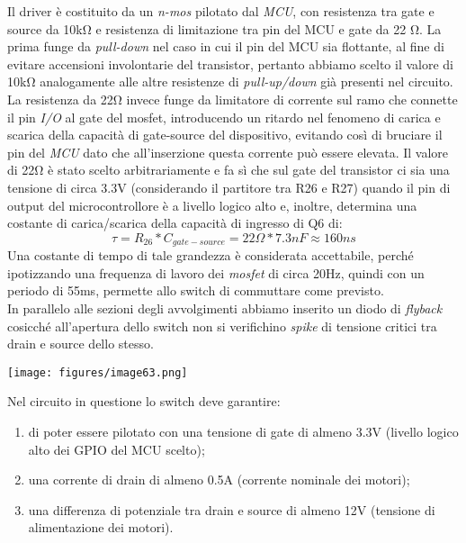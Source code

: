 \noindent Il driver è costituito da un \textit{n-mos} pilotato dal \textit{MCU}, con resistenza tra gate e source da 10kΩ 
e resistenza di limitazione tra pin del MCU e gate da 22 Ω. 
La prima funge da \textit{pull-down} nel caso in cui il pin
del MCU sia flottante, al fine di evitare accensioni involontarie del
transistor, pertanto abbiamo scelto il valore di 10kΩ analogamente alle
altre resistenze di \textit{pull-up/down} già presenti nel circuito. La
resistenza da 22Ω invece funge da limitatore di corrente sul ramo che connette il pin \textit{I/O} al
gate del mosfet, introducendo un ritardo nel fenomeno di carica e scarica
della capacità di gate-source del dispositivo, evitando così di bruciare
il pin del \textit{MCU} dato che all'inserzione questa corrente può essere
elevata. Il valore di 22Ω è stato scelto arbitrariamente e fa sì che sul
gate del transistor ci sia una tensione di circa 3.3V (considerando il
partitore tra R26 e R27) quando il pin di output del microcontrollore è
a livello logico alto e, inoltre, determina una costante di
carica/scarica della capacità di ingresso di Q6 di:
\[\tau = R_{ 26} * C_{gate - source} = 22 \Omega * 7.3nF \approx 160ns\]
Una costante di tempo di tale grandezza è considerata accettabile,
perché ipotizzando una frequenza di lavoro dei \textit{mosfet} di circa 20Hz,
quindi con un periodo di 55ms, permette allo switch di commuttare come
previsto.\\
In parallelo alle sezioni degli avvolgimenti abbiamo inserito un diodo di
\textit{flyback} cosicché all'apertura dello switch non si verifichino \textit{spike} di
tensione critici tra drain e source dello stesso.

\begin{center}
\texttt{[image: figures/image63.png]}
\captionsetup{type=figure}
\end{center}

\noindent Nel circuito in questione lo switch deve garantire:

\begin{enumerate}
\def\labelenumi{\arabic{enumi}.}
\item
  
  di poter essere pilotato con una tensione di gate di almeno 3.3V
  (livello logico alto dei GPIO del MCU scelto);
  
\item
  
  una corrente di drain di almeno 0.5A (corrente nominale dei motori);
  
\item
  
  una differenza di potenziale tra drain e source di almeno 12V
  (tensione di alimentazione dei motori).
  
\end{enumerate}

